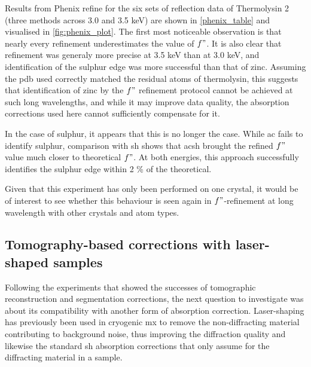 Results from Phenix refine for the six sets of reflection data of Thermolysin 2 (three methods across 3.0 and 3.5 \unit{keV}) are shown in \cref{phenix_table} and visualised in \cref{fig:phenix_plot}. The first most noticeable observation is that nearly every refinement underestimates the value of $f"$. It is also clear that refinement was generaly more precise at 3.5 \unit{keV} than at 3.0 \unit{keV}, and identification of the sulphur edge was more successful than that of zinc. Assuming the \ac{pdb} used correctly matched the residual atoms of thermolysin, this suggests that identification of zinc by the $f"$ refinement protocol cannot be achieved at such long wavelengths, and while it may improve data quality, the absorption corrections used here cannot sufficiently compensate for it. %

In the case of sulphur, it appears that this is no longer the case. While \ac{ac} fails to identify sulphur, comparison with \ac{sh} shows that \ac{acsh} brought the refined $f"$ value much closer to theoretical $f"$. At both energies, this approach successfully identifies the sulphur edge within 2 \% of the theoretical.%

Given that this experiment has only been performed on one crystal, it would be of interest to see whether this behaviour is seen again in $f"$-refinement at long wavelength with other crystals and atom types. %

\subsection{Tomography-based corrections with laser-shaped samples}

Following the experiments that showed the successes of tomographic reconstruction and segmentation corrections, the next question to investigate was about its compatibility with another form of absorption correction. Laser-shaping has previously been used in cryogenic \ac{mx} to remove the non-diffracting material contributing to background noise, thus improving the diffraction quality and likewise the standard \ac{sh} absorption corrections that only assume for the diffracting material in a sample.

